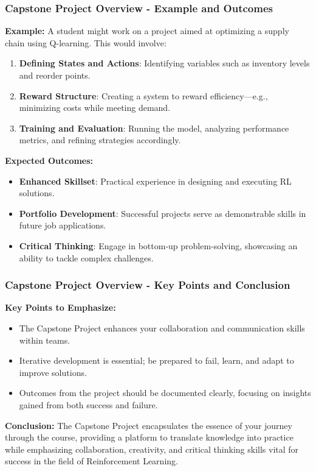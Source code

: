 \documentclass{beamer}
\begin{document}
\begin{frame}[fragile]
    \frametitle{Capstone Project Overview - Example and Outcomes}
    \textbf{Example:} 
    A student might work on a project aimed at optimizing a supply chain using Q-learning. This would involve:
    \begin{enumerate}
        \item \textbf{Defining States and Actions}: Identifying variables such as inventory levels and reorder points.
        \item \textbf{Reward Structure}: Creating a system to reward efficiency—e.g., minimizing costs while meeting demand.
        \item \textbf{Training and Evaluation}: Running the model, analyzing performance metrics, and refining strategies accordingly.
    \end{enumerate}

    \textbf{Expected Outcomes:}
    \begin{itemize}
        \item \textbf{Enhanced Skillset}: Practical experience in designing and executing RL solutions.
        \item \textbf{Portfolio Development}: Successful projects serve as demonstrable skills in future job applications.
        \item \textbf{Critical Thinking}: Engage in bottom-up problem-solving, showcasing an ability to tackle complex challenges.
    \end{itemize}
\end{frame}

\begin{frame}[fragile]
    \frametitle{Capstone Project Overview - Key Points and Conclusion}
    \textbf{Key Points to Emphasize:}
    \begin{itemize}
        \item The Capstone Project enhances your collaboration and communication skills within teams.
        \item Iterative development is essential; be prepared to fail, learn, and adapt to improve solutions.
        \item Outcomes from the project should be documented clearly, focusing on insights gained from both success and failure.
    \end{itemize}

    \textbf{Conclusion:} 
    The Capstone Project encapsulates the essence of your journey through the course, providing a platform to translate knowledge into practice while emphasizing collaboration, creativity, and critical thinking skills vital for success in the field of Reinforcement Learning.
\end{frame}
\end{document}
